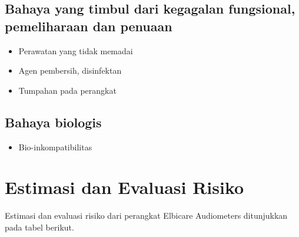 \documentclass[11pt,a4paper,twoside,onecolumn]{book}
\begin{document}
			\subsection{Bahaya yang timbul dari kegagalan fungsional, pemeliharaan dan penuaan}
			\begin{itemize}
				\item Perawatan yang tidak memadai
				\item Agen pembersih, disinfektan
				\item Tumpahan pada perangkat
			\end{itemize}
			
			\subsection{Bahaya biologis}
			\begin{itemize}
				\item Bio-inkompatibilitas
			\end{itemize}
			
		\section{Estimasi dan Evaluasi Risiko}
		Estimasi dan evaluasi risiko dari perangkat Elbicare Audiometers ditunjukkan pada tabel berikut.
		
\end{document}
